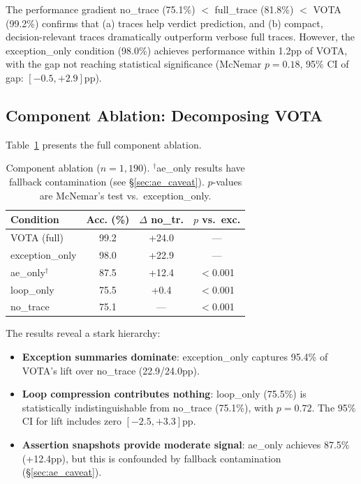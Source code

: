 \documentclass[11pt,a4paper]{article}
\begin{document}
The performance gradient no\_trace (75.1\%) $<$ full\_trace (81.8\%) $<$ VOTA (99.2\%) confirms that (a) traces help verdict prediction, and (b) compact, decision-relevant traces dramatically outperform verbose full traces.
However, the exception\_only condition (98.0\%) achieves performance within 1.2pp of VOTA, with the gap not reaching statistical significance (McNemar $p=0.18$, 95\% CI of gap: $[-0.5, +2.9]$pp).

\subsection{Component Ablation: Decomposing VOTA}
\label{sec:ablation}

Table~\ref{tab:ablation} presents the full component ablation.

\begin{table}[t]
\centering
\small
\begin{tabular}{lccc}
\toprule
\textbf{Condition} & \textbf{Acc. (\%)} & \textbf{$\Delta$ no\_tr.} & \textbf{$p$ vs.\ exc.} \\
\midrule
VOTA (full) & 99.2 & +24.0 & --- \\
exception\_only & 98.0 & +22.9 & --- \\
ae\_only$^\dagger$ & 87.5 & +12.4 & $<$0.001 \\
loop\_only & 75.5 & +0.4 & $<$0.001 \\
no\_trace & 75.1 & --- & $<$0.001 \\
\bottomrule
\end{tabular}
\caption{Component ablation ($n=1{,}190$). $^\dagger$ae\_only results have fallback contamination (see \S\ref{sec:ae_caveat}). $p$-values are McNemar's test vs.\ exception\_only.}
\label{tab:ablation}
\end{table}

The results reveal a stark hierarchy:
\begin{itemize}
\item \textbf{Exception summaries dominate}: exception\_only captures 95.4\% of VOTA's lift over no\_trace (22.9/24.0pp).
\item \textbf{Loop compression contributes nothing}: loop\_only (75.5\%) is statistically indistinguishable from no\_trace (75.1\%), with $p=0.72$. The 95\% CI for lift includes zero $[-2.5, +3.3]$pp.
\item \textbf{Assertion snapshots provide moderate signal}: ae\_only achieves 87.5\% (+12.4pp), but this is confounded by fallback contamination (\S\ref{sec:ae_caveat}).
\end{itemize}
\end{document}
